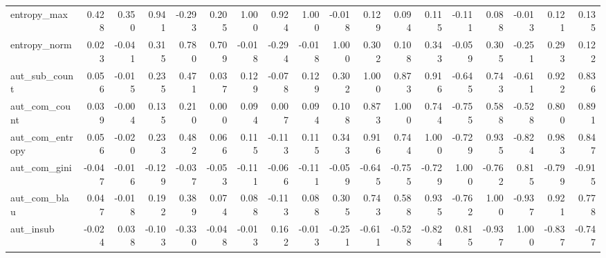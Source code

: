 \begin{table}
\begin{tabular}{lrrrrrrrrrrrrrrrrr}
entropy\_max         &         0.428 &          0.350 &    0.941 & -0.293 &  0.205 &               1.000 &                0.924 &        1.000 &        -0.018 &          0.129 &          0.094 &            0.115 &        -0.111 &         0.088 &     -0.013 &                0.121 &                0.135 \\
entropy\_norm        &         0.023 &         -0.041 &    0.315 &  0.780 &  0.709 &              -0.018 &               -0.294 &       -0.018 &         1.000 &          0.302 &          0.108 &            0.343 &        -0.059 &         0.305 &     -0.251 &                0.293 &                0.122 \\
aut\_sub\_count       &         0.056 &         -0.015 &    0.235 &  0.471 &  0.037 &               0.129 &               -0.078 &        0.129 &         0.302 &          1.000 &          0.873 &            0.916 &        -0.645 &         0.743 &     -0.611 &                0.922 &                0.836 \\
aut\_com\_count       &         0.039 &         -0.004 &    0.135 &  0.210 &  0.000 &               0.094 &                0.007 &        0.094 &         0.108 &          0.873 &          1.000 &            0.744 &        -0.755 &         0.588 &     -0.528 &                0.800 &                0.891 \\
aut\_com\_entropy     &         0.056 &         -0.020 &    0.233 &  0.482 &  0.066 &               0.115 &               -0.113 &        0.115 &         0.343 &          0.916 &          0.744 &            1.000 &        -0.729 &         0.935 &     -0.824 &                0.983 &                0.847 \\
aut\_com\_gini        &        -0.047 &         -0.016 &   -0.129 & -0.037 & -0.053 &              -0.111 &               -0.066 &       -0.111 &        -0.059 &         -0.645 &         -0.755 &           -0.729 &         1.000 &        -0.762 &      0.815 &               -0.799 &               -0.915 \\
aut\_com\_blau        &         0.047 &         -0.018 &    0.192 &  0.389 &  0.074 &               0.088 &               -0.113 &        0.088 &         0.305 &          0.743 &          0.588 &            0.935 &        -0.762 &         1.000 &     -0.937 &                0.921 &                0.778 \\
aut\_insub           &        -0.024 &          0.038 &   -0.103 & -0.330 & -0.048 &              -0.013 &                0.162 &       -0.013 &        -0.251 &         -0.611 &         -0.528 &           -0.824 &         0.815 &        -0.937 &      1.000 &               -0.837 &               -0.747 \\

\end{tabular}
\end{table}
